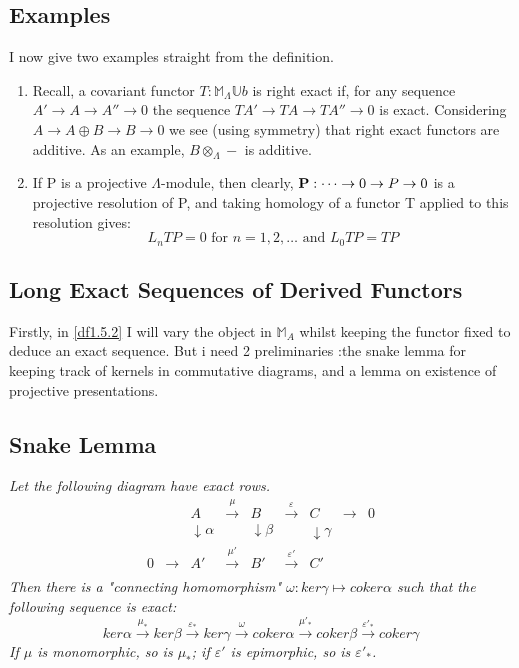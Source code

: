 \subsection{Examples}\label{df1.4.1}
I now give two examples straight from the definition.

\begin{enumerate}
    \item Recall, a covariant functor $T:\mathbb M_\Lambda \mathbb
    U b$ is right exact if, for any sequence $A'\rightarrow
    A\rightarrow A''\rightarrow 0$ the sequence $TA'\rightarrow
    TA\rightarrow TA''\rightarrow 0$ is exact. Considering
    $A\rightarrow A\oplus B\rightarrow B\rightarrow 0$ we see (using symmetry) that
    right exact functors are additive. As an example,
    $B\otimes_\Lambda -$ is additive.
    \item If P is a projective $\Lambda$-module, then clearly,
    $\textbf P: \dots \rightarrow 0\rightarrow P\rightarrow 0 $ is
    a projective resolution of P, and taking homology of a functor
    T applied to this resolution gives: $$L_nTP = 0 \text{ for
    }n=1,2,\dots \text{ and }L_0TP = TP$$
\end{enumerate}

\subsection{Long Exact Sequences of Derived Functors}\label{df1.5}

Firstly, in \ref{df1.5.2} I will vary the object in $\mathbb M_A$
whilst keeping the functor fixed to deduce an exact sequence. But
i need 2 preliminaries :the snake lemma for keeping track of
kernels in commutative diagrams, and a lemma on existence of
projective presentations.

\subsection{Snake Lemma}\label{df1.5.1}
\emph{Let the following diagram have exact rows.
$$\begin{array}{ccccccccc}
    &  & A   & \xrightarrow{\mu} & B  & \xrightarrow{\varepsilon}  & C & \longrightarrow & 0 \\
    &   & \downarrow\alpha &   & \downarrow\beta &    & \downarrow \gamma &  &  \\
  0 & \longrightarrow & A'  & \xrightarrow{\mu'} & B' &\xrightarrow{\varepsilon'}& C' &  &  \\
\end{array}$$
Then there is a "connecting homomorphism" $\omega:ker \gamma
\mapsto coker \alpha$ such that the following sequence is exact:
$$ker\alpha\xrightarrow{\mu_*}ker\beta\xrightarrow{\varepsilon_*}ker\gamma\xrightarrow{\omega}
coker\alpha\xrightarrow{\mu'_*}coker\beta
\xrightarrow{\varepsilon'_*}coker\gamma$$ If $\mu$ is monomorphic,
so is $\mu_*$; if $\varepsilon'$ is epimorphic, so is
$\varepsilon'_*$.}

